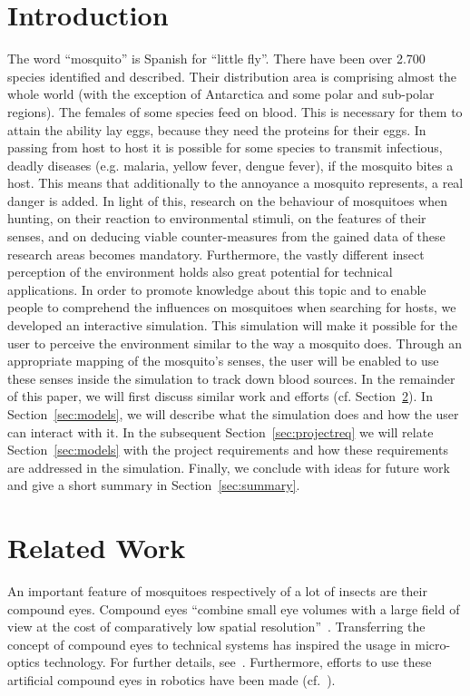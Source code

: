 \documentclass{sig-alternate-05-2015}
\begin{document}
\section{Introduction}
The word ``mosquito'' is Spanish for ``little fly''\cite{howstuff}. There have been over 2.700 species identified and described. Their distribution area is comprising almost the whole world (with the exception of Antarctica and some polar and sub-polar regions). The females of some species feed on blood. This is necessary for them to attain the ability lay eggs, because they need the proteins for their eggs. In passing from host to host it is possible for some species to transmit infectious, deadly diseases (e.g. malaria, yellow fever, dengue fever), if the mosquito bites a host. This means that additionally to the annoyance a mosquito represents, a real danger is added. In light of this, research on the behaviour of mosquitoes when hunting, on their reaction to environmental stimuli, on the features of their senses, and on deducing viable counter-measures from the gained data of these research areas becomes mandatory. Furthermore, the vastly different insect perception of the environment holds also great potential for technical applications.
In order to promote knowledge about this topic and to enable people to comprehend the influences on mosquitoes when searching for hosts, we developed an interactive simulation. This simulation will make it possible for the user to perceive the environment similar to the way a mosquito does. Through an appropriate mapping of the mosquito's senses, the user will be enabled to use these senses inside the simulation to track down blood sources.
In the remainder of this paper, we will first discuss similar work and efforts (cf. Section~\ref{sec:relatedwork}). In Section~\ref{sec:models}, we will describe what the simulation does and how the user can interact with it. In the subsequent Section~\ref{sec:projectreq} we will relate Section~\ref{sec:models} with the project requirements and how these requirements are addressed in the simulation. Finally, we conclude with ideas for future work and give a short summary in Section~\ref{sec:summary}.

\section{Related Work}
\label{sec:relatedwork}

An important feature of mosquitoes respectively of a lot of insects are their compound eyes. Compound eyes ``combine small eye volumes with a large field of view at the cost of comparatively low spatial resolution''~\cite{duparre2006}. Transferring the concept of compound eyes to technical systems has inspired the usage in micro-optics technology. For further details, see~\cite{duparre2006, duparre2004, voelkel2003, hamanaka1996}.
Furthermore, efforts to use these artificial compound eyes in robotics have been made (cf.~\cite{martin1994, lichtensteiger1999}). 
\end{document}
